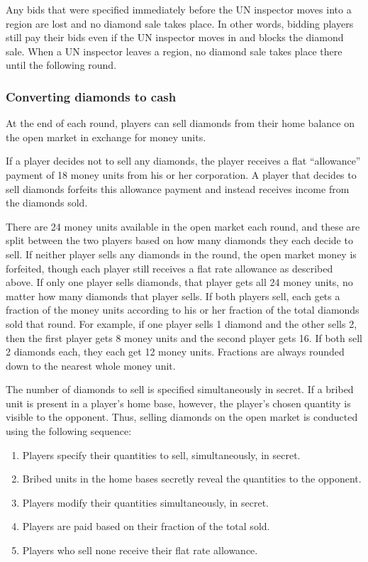 Any bids that were specified immediately before the UN inspector moves into a region are lost and no diamond sale takes place.  In other words, bidding players still pay their bids even if the UN inspector moves in and blocks the diamond sale.  When a UN inspector leaves a region, no diamond sale takes place there until the following round.

\subsubsection{Converting diamonds to cash}
At the end of each round, players can sell diamonds from their home balance on the open market in exchange for money units.  

If a player decides not to sell any diamonds, the player receives a flat ``allowance'' payment of 18 money units from his or her corporation.  A player that decides to sell diamonds forfeits this allowance payment and instead receives income from the diamonds sold.

There are 24 money units available in the open market each round, and these are split between the two players based on how many diamonds they each decide to sell.  If neither player sells any diamonds in the round, the open market money is forfeited, though each player still receives a flat rate allowance as described above.  If only one player sells diamonds, that player gets all 24 money units, no matter how many diamonds that player sells.  If both players sell, each gets a fraction of the money units according to his or her fraction of the total diamonds sold that round.  For example, if one player sells 1 diamond and the other sells 2, then the first player gets 8 money units and the second player gets 16.  If both sell 2 diamonds each, they each get 12 money units.  Fractions are always rounded down to the nearest whole money unit.   

The number of diamonds to sell is specified simultaneously in secret.  If a bribed unit is present in a player's home base, however, the player's chosen quantity is visible to the opponent.  Thus, selling diamonds on the open market is conducted using the following sequence: 
\begin{enumerate}
\item Players specify their quantities to sell, simultaneously, in secret.
\item Bribed units in the home bases secretly reveal the quantities to the opponent.
\item Players modify their quantities simultaneously, in secret.
\item Players are paid based on their fraction of the total sold.
\item Players who sell none receive their flat rate allowance.
\end{enumerate}

